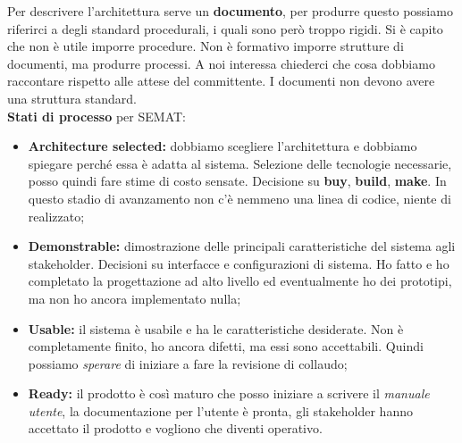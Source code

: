 Per descrivere l'architettura serve un \textbf{documento}, per produrre questo possiamo riferirci a degli standard procedurali, i quali sono però troppo rigidi. Si è capito che non è utile imporre procedure. Non è formativo imporre strutture di documenti, ma produrre processi. A noi interessa chiederci che cosa dobbiamo raccontare rispetto alle attese del committente. I documenti non devono avere una struttura standard.\\

\textbf{Stati di processo} per SEMAT:

\begin{itemize}

	\item \textbf{Architecture selected:} dobbiamo scegliere l'architettura e dobbiamo spiegare perché essa è adatta al sistema. Selezione delle tecnologie necessarie, posso quindi fare stime di costo sensate. Decisione su \textbf{buy}, \textbf{build}, \textbf{make}. In questo stadio di avanzamento non c'è nemmeno una linea di codice, niente di realizzato;
	\item \textbf{Demonstrable:} dimostrazione delle principali caratteristiche del sistema agli stakeholder. Decisioni su interfacce e configurazioni di sistema. Ho fatto e ho completato la progettazione ad alto livello ed eventualmente ho dei prototipi, ma non ho ancora implementato nulla;
	\item \textbf{Usable:} il sistema è usabile e ha le caratteristiche desiderate. Non è completamente finito, ho ancora difetti, ma essi sono accettabili. Quindi possiamo \textit{sperare} di iniziare a fare la revisione di collaudo;
	\item \textbf{Ready:} il prodotto è così maturo che posso iniziare a scrivere il \textit{manuale utente}, la documentazione per l'utente è pronta, gli stakeholder hanno accettato il prodotto e vogliono che diventi operativo.
\end{itemize}

